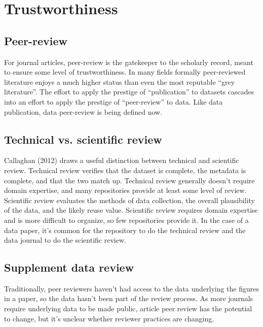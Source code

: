 \documentclass[10pt,a4paper,twocolumn]{article}
\begin{document}
\section*{Trustworthiness}\label{trustworthiness}

\subsection*{Peer-review}\label{peer-review}

For journal articles, peer-review is the gatekeeper to the scholarly record, meant to ensure some level of trustworthiness.
In many fields formally peer-reviewed literature enjoys a much higher status than even the most reputable ``grey literature''.
The effort to apply the prestige of ``publication'' to datasets cascades into an effort to apply the prestige of ``peer-review'' to data.
Like data publication, data peer-review is being defined now.

\subsection*{Technical vs. scientific review}
Callaghan (2012)\cite{callaghan_making_2012} draws a useful distinction between technical and scientific review. 
Technical review verifies that the dataset is complete, the metadata is complete, and that the two match up.  
Technical review generally doesn't require domain expertise, and many repositories provide at least some level of review. 
Scientific review evaluates the methods of data collection, the overall plausibility of the data, and the likely reuse value. 
Scientific review requires domain expertise and is more difficult to organize, so few repositories provide it.
In the case of a data paper, it's common for the repository to do the technical review and the data journal to do the scientific review.

\subsection*{Supplement data review}
Traditionally, peer reviewers haven't had access to the data underlying the figures in a paper, so the data hasn't been part of the review process.
As more journals require underlying data to be made public, article peer review has the potential to change, but it's unclear whether reviewer practices are changing.
\end{document}
